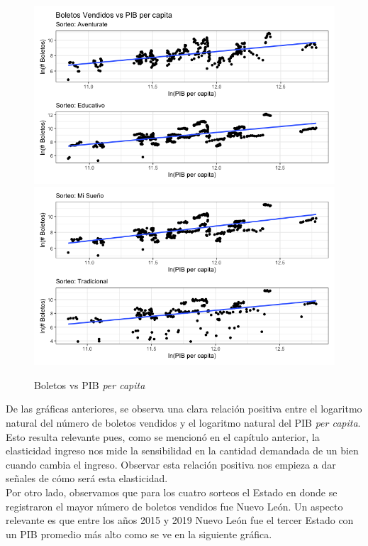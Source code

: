 \begin{figure}[H]
    \caption{Boletos vs PIB \textit{per capita}}
    \label{fig:scat}
    \includegraphics[scale = 0.35]{Imagenes/yvsx1.png}
    \centering
    \includegraphics[scale = 0.35]{Imagenes/yvsx2.png} \\
    \centering
\end{figure}

De las gráficas anteriores, se observa una clara relación positiva entre el logaritmo natural del número de boletos vendidos y el logaritmo natural del PIB \textit{per capita}. Esto resulta relevante pues, como se mencionó en el capítulo anterior, la elasticidad ingreso nos mide la sensibilidad en la cantidad demandada de un bien cuando cambia el ingreso. Observar esta relación positiva nos empieza a dar señales de cómo será esta elasticidad. \\

Por otro lado, observamos que para los cuatro sorteos el Estado en donde se registraron el mayor número de boletos vendidos fue Nuevo León. Un aspecto relevante es que entre los años 2015 y 2019 Nuevo León fue el tercer Estado con un PIB promedio más alto como se ve en la siguiente gráfica.

